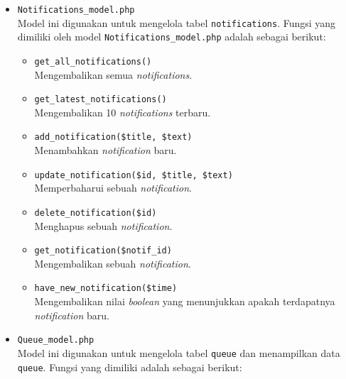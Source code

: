 \begin{itemize}
	\item \verb|Notifications_model.php| \\
	      Model ini digunakan untuk mengelola tabel \verb|notifications|. Fungsi yang dimiliki oleh model \verb|Notifications_model.php| adalah sebagai berikut:

	      \begin{itemize}
		      \item \verb|get_all_notifications()| \\
		            Mengembalikan semua \textit{notifications}.
		      \item \verb|get_latest_notifications()| \\
		            Mengembalikan 10 \textit{notifications} terbaru.
		      \item \verb|add_notification($title, $text)| \\
		            Menambahkan \textit{notification} baru.
		      \item \verb|update_notification($id, $title, $text)| \\
		            Memperbaharui sebuah \textit{notification}.
		      \item \verb|delete_notification($id)| \\
		            Menghapus sebuah \textit{notification}.
		      \item \verb|get_notification($notif_id)| \\
		            Mengembalikan sebuah \textit{notification}.
		      \item \verb|have_new_notification($time)| \\
		            Mengembalikan nilai \textit{boolean} yang menunjukkan apakah terdapatnya \textit{notification} baru.
	      \end{itemize}

	\item \verb|Queue_model.php| \\
	      Model ini digunakan untuk mengelola tabel \verb|queue| dan menampilkan data \verb|queue|. Fungsi yang dimiliki adalah sebagai berikut:


\end{itemize}
